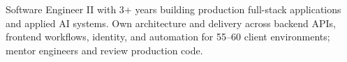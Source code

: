 \begingroup
\raggedright
{}
Software Engineer II with 3+ years building production full-stack applications and applied AI systems. Own architecture and delivery across backend APIs, frontend workflows, identity, and automation for 55--60 client environments; mentor engineers and review production code.
\par
\endgroup
